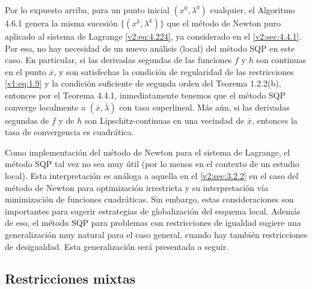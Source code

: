 Por lo expuesto arriba, para un punto inicial $(x^0, \lambda^0)$ cualquier, el Algoritmo 4.6.1 genera la misma sucesión $\{(x^k, \lambda^k)\}$ que el método de Newton puro aplicado al sistema de Lagrange \eqref{v2:eq:4.224}, ya considerado en el \cref{v2:sec:4.4.1}. Por eso, no hay necesidad de un nuevo análisis (local) del método SQP en este caso. En particular, si las derivadas segundas de las funciones $f$ y $h$ son continuas en el punto $\bar{x}$, y son satisfechas la condición de regularidad de las restricciones \eqref{v1:eq:1.9} y la condición suficiente de segunda orden del Teorema 1.2.2(b), entonces por el Teorema 4.4.1, inmediatamente tenemos que el método SQP converge localmente a $(\bar{x}, \bar{\lambda})$ con tasa superlineal. Más aún, si las derivadas segundas de $f$ y de $h$ son Lipschitz-continuas en una vecindad de $\bar{x}$, entonces la tasa de convergencia es cuadrática.

Como implementación del método de Newton para el sistema de Lagrange, el método SQP tal vez no sea muy útil (por lo menos en el contexto de un estudio local). Esta interpretación es análoga a aquella en el \cref{v2:sec:3.2.2} en el caso del método de Newton para optimización irrestricta y su interpretación vía minimización de funciones cuadráticas. Sin embargo, estas consideraciones son importantes para sugerir estrategias de globalización del esquema local. Además de eso, el método SQP para problemas con restricciones de igualdad sugiere una generalización muy natural para el caso general, cuando hay también restricciones de desigualdad. Esta generalización será presentada a seguir.


\subsection{Restricciones mixtas}\label{v2:sec:4.6.2}

